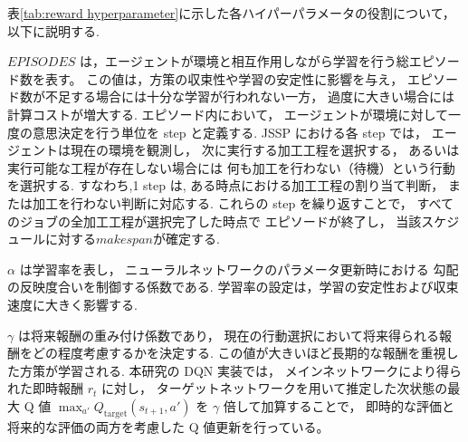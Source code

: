 \documentclass{jarticle}
\begin{document}
\begin{table}[htbp]
\centering
\caption{モデル訓練で調整するハイパーパラメータ}
\label{tab:reward hyperparameter}
\end{table}

表\ref{tab:reward hyperparameter}に示した各ハイパーパラメータの役割について，
以下に説明する.

$EPISODES$ は，エージェントが環境と相互作用しながら学習を行う総エピソード数を表す。
この値は，方策の収束性や学習の安定性に影響を与え，
エピソード数が不足する場合には十分な学習が行われない一方，
過度に大きい場合には計算コストが増大する.
エピソード内において，
エージェントが環境に対して一度の意思決定を行う単位を
step と定義する.
JSSP における各 step では，
エージェントは現在の環境を観測し，
次に実行する加工工程を選択する，
あるいは実行可能な工程が存在しない場合には
何も加工を行わない（待機）という行動を選択する.
すなわち,1 step は,
ある時点における加工工程の割り当て判断，
または加工を行わない判断に対応する.
これらの step を繰り返すことで，
すべてのジョブの全加工工程が選択完了した時点で
エピソードが終了し，
当該スケジュールに対する$makespan$が確定する.

$\alpha$ は学習率を表し，
ニューラルネットワークのパラメータ更新時における
勾配の反映度合いを制御する係数である.
学習率の設定は，学習の安定性および収束速度に大きく影響する.

$\gamma$ は将来報酬の重み付け係数であり，
現在の行動選択において将来得られる報酬をどの程度考慮するかを決定する.
この値が大きいほど長期的な報酬を重視した方策が学習される.
本研究の DQN 実装では，
メインネットワークにより得られた即時報酬 $r_t$ に対し，
ターゲットネットワークを用いて推定した次状態の最大 Q 値
$\max_{a'} Q_{\mathrm{target}}(s_{t+1}, a')$ を
$\gamma$ 倍して加算することで，
即時的な評価と将来的な評価の両方を考慮した Q 値更新を行っている。
\end{document}
